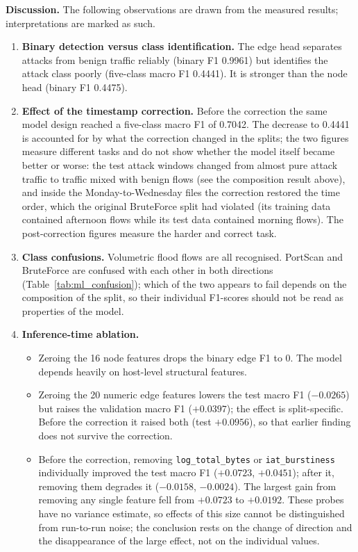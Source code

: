 \documentclass[12pt,a4paper]{report}
\begin{document}
\par\textbf{Discussion.} The following observations are drawn from the measured results; interpretations are marked as such.
\begin{enumerate}
    \item \textbf{Binary detection versus class identification.} The edge head separates attacks from benign traffic reliably (binary F1 0.9961) but identifies the attack class poorly (five-class macro F1 0.4441). It is stronger than the node head (binary F1 0.4475).
    \item \textbf{Effect of the timestamp correction.} Before the correction the same model design reached a five-class macro F1 of 0.7042. The decrease to 0.4441 is accounted for by what the correction changed in the splits; the two figures measure different tasks and do not show whether the model itself became better or worse: the test attack windows changed from almost pure attack traffic to traffic mixed with benign flows (see the composition result above), and inside the Monday-to-Wednesday files the correction restored the time order, which the original BruteForce split had violated (its training data contained afternoon flows while its test data contained morning flows). The post-correction figures measure the harder and correct task.
    \item \textbf{Class confusions.} Volumetric flood flows are all recognised. PortScan and BruteForce are confused with each other in both directions (Table~\ref{tab:ml_confusion}); which of the two appears to fail depends on the composition of the split, so their individual F1-scores should not be read as properties of the model.
    \item \textbf{Inference-time ablation.}
    \begin{itemize}
        \item Zeroing the 16 node features drops the binary edge F1 to 0. The model depends heavily on host-level structural features.
        \item Zeroing the 20 numeric edge features lowers the test macro F1 ($-0.0265$) but raises the validation macro F1 ($+0.0397$); the effect is split-specific. Before the correction it raised both (test $+0.0956$), so that earlier finding does not survive the correction.
        \item Before the correction, removing \texttt{log\_total\_bytes} or \texttt{iat\_burstiness} individually improved the test macro F1 ($+0.0723$, $+0.0451$); after it, removing them degrades it ($-0.0158$, $-0.0024$). The largest gain from removing any single feature fell from $+0.0723$ to $+0.0192$. These probes have no variance estimate, so effects of this size cannot be distinguished from run-to-run noise; the conclusion rests on the change of direction and the disappearance of the large effect, not on the individual values.

\end{itemize}
\end{enumerate}
\end{document}
